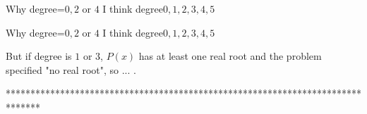 \begin{solution}

Why degree=$ 0,2$ or $ 4$
I think degree$ 0,1,2,3,4,5$
\end{solution}



\begin{solution}
	\begin{tcolorbox} Why degree=$ 0,2$ or $ 4$
I think degree$ 0,1,2,3,4,5$\end{tcolorbox}

But if degree is $ 1$ or $ 3$, $ P(x)$ has at least one real root and the problem specified "no real root", so ... .
\end{solution}
*******************************************************************************
